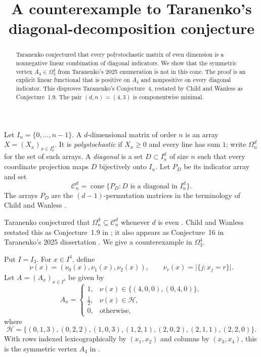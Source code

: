 \documentclass[11pt]{amsart}
\title[Taranenko's diagonal-decomposition conjecture]
{A counterexample to Taranenko's diagonal-decomposition conjecture}
\date{}
\theoremstyle{remark}
\begin{document}
\begin{abstract}
Taranenko conjectured that every polystochastic matrix of even dimension is a
nonnegative linear combination of diagonal indicators. We show that the
symmetric vertex $A_4\in\Omega_3^4$ from Taranenko's 2025 enumeration is not
in this cone. The proof is an explicit linear functional that is positive on
$A_4$ and nonpositive on every diagonal indicator. This disproves
Taranenko's Conjecture~4, restated by Child and Wanless as Conjecture~1.9.
The pair $(d,n)=(4,3)$ is componentwise minimal.
\end{abstract}

\maketitle

Let $I_n=\{0,\ldots,n-1\}$. A $d$-dimensional matrix of order $n$ is an
array $X=(X_x)_{x\in I_n^d}$. It is \emph{polystochastic} if $X_x\geq0$ and
every line has sum $1$; write $\Omega_n^d$ for the set of such arrays. A
\emph{diagonal} is a set $D\subset I_n^d$ of size $n$ such that every
coordinate projection maps $D$ bijectively onto $I_n$. Let $P_D$ be its
indicator array and set
\[
  \mathcal C_n^d=\operatorname{cone}\{P_D:D\text{ is a diagonal in }I_n^d\}.
\]
The arrays $P_D$ are the $(d-1)$-permutation matrices in the terminology of
Child and Wanless \cite{ChildWanless2020}.

Taranenko conjectured that $\Omega_n^d\subseteq\mathcal C_n^d$ whenever
$d$ is even \cite[Conjecture~4]{Taranenko2016}. Child and Wanless restated
this as Conjecture~1.9 in \cite{ChildWanless2020}; it also appears as
Conjecture~16 in Taranenko's 2025 dissertation
\cite{TaranenkoDissertation}. We give a counterexample in $\Omega_3^4$.

Put $I=I_3$. For $x\in I^4$, define
\[
  \nu(x)=(\nu_0(x),\nu_1(x),\nu_2(x)),
  \qquad
  \nu_r(x)=\bigl|\{j:x_j=r\}\bigr|.
\]
Let $A=(A_x)_{x\in I^4}$ be given by
\begin{equation}\label{eq:A}
A_x=
\begin{cases}
1,
  &\nu(x)\in\{(4,0,0),(0,4,0)\},\\[1mm]
\tfrac12,
  &\nu(x)\in\mathcal H,\\[1mm]
0,
  &\text{otherwise},
\end{cases}
\end{equation}
where
\begin{equation}\label{eq:H}
\mathcal H=
\bigl\{
(0,1,3),(0,2,2),(1,0,3),(1,2,1),
(2,0,2),(2,1,1),(2,2,0)
\bigr\}.
\end{equation}
With rows indexed lexicographically by $(x_1,x_2)$ and columns by
$(x_3,x_4)$, this is the symmetric vertex $A_4$ in
\cite[Appendix, item~4]{Taranenko2025}.
\end{document}
